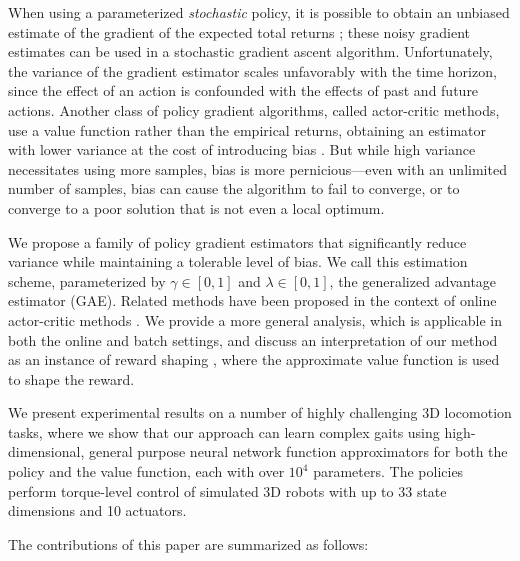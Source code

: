 When using a parameterized \textit{stochastic} policy, it is possible to obtain an unbiased estimate of the gradient of the expected total returns \citep{williams1992simple,sutton1999policy,baxter2000reinforcement}; these noisy gradient estimates can be used in a stochastic gradient ascent algorithm. Unfortunately, the variance of the gradient estimator scales unfavorably with the time horizon, since the effect of an action is confounded with the effects of past and future actions. Another class of policy gradient algorithms, called actor-critic methods, use a value function rather than the empirical returns, obtaining an estimator with lower variance at the cost of introducing bias \citep{konda2003onactor,hafner2011reinforcement}. But while high variance necessitates using more samples, bias is more pernicious---even with an unlimited number of samples, bias can cause the algorithm to fail to converge, or to converge to a poor solution that is not even a local optimum.

We propose a family of policy gradient estimators that significantly reduce variance while maintaining a tolerable level of bias. We call this estimation scheme, parameterized by $\gamma \in [0,1]$ and $\lambda \in [0,1]$, the generalized advantage estimator (GAE). Related methods have been proposed in the context of online actor-critic methods \citep{kimura1998analysis,wawrzynski2009real}. We provide a more general analysis, which is applicable in both the online and batch settings, and discuss an interpretation of our method as an instance of reward shaping \citep{ng1999policy}, where the approximate value function is used to shape the reward.

We present experimental results on a number of highly challenging 3D locomotion tasks, where we show that our approach can learn complex gaits using high-dimensional, general purpose neural network function approximators for both the policy and the value function, each with over $10^4$ parameters. The policies perform torque-level control of simulated 3D robots with up to 33 state dimensions and 10 actuators.

The contributions of this paper are summarized as follows:


